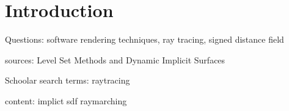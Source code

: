 \section{Introduction}
\label{section:Introduction}

Questions: software rendering techniques, ray tracing, signed distance field

sources: Level Set Methods and Dynamic Implicit Surfaces

Schoolar search terms: 
raytracing


content:
implict
sdf
raymarching